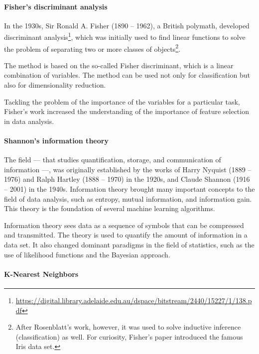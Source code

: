 \paragraph{Fisher's discriminant analysis}

In the 1930s, Sir Ronald A. Fisher (1890 -- 1962), a British polymath, developed
discriminant analysis\footnote{\url{https://digital.library.adelaide.edu.au/dspace/bitstream/2440/15227/1/138.pdf}},
which was initially used to find linear functions to solve the problem of separating two or
more classes of objects\footnote{After Rosenblatt's work, however, it was used to solve
inductive inference (classification) as well.  For curiosity, Fisher's paper
introduced the famous Iris data set.}.

The method is based on the so-called Fisher discriminant, which is a linear
combination of variables.  The method can be used not only for classification but also for
dimensionality reduction.

Tackling the problem of the importance of the variables for a particular task, Fisher's
work increased the understanding of the importance of feature selection in data analysis.


\paragraph{Shannon's information theory}

The field --- that studies quantification, storage, and communication of information ---, was
originally established by the works of Harry Nyquist (1889 -- 1976) and Ralph Hartley
(1888 -- 1970) in the 1920s, and Claude Shannon (1916 -- 2001) in the 1940s.
Information theory brought many important concepts to the field of data analysis, such as
entropy, mutual information, and information gain.  This theory is the foundation of
several machine learning algorithms.

Information theory sees data as a sequence of symbols that can be compressed and
transmitted.  The theory is used to quantify the amount of information in a data set.
It also changed dominant paradigms in the field of statistics, such as the use of
likelihood functions and the Bayesian approach.


\paragraph{K-Nearest Neighbors}

